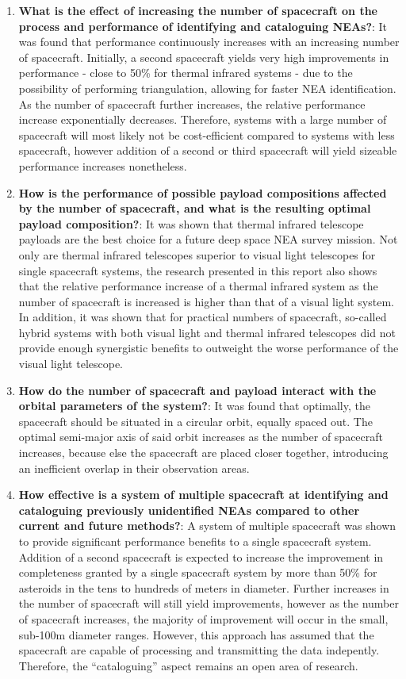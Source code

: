 \begin{enumerate}
 \item \textbf{What is the effect of increasing the number of spacecraft on the process and performance of identifying and cataloguing NEAs?}: It was found that performance continuously increases with an increasing number of spacecraft. Initially, a second spacecraft yields very high improvements in performance - close to 50\% for thermal infrared systems - due to the possibility of performing triangulation, allowing for faster NEA identification. As the number of spacecraft further increases, the relative performance increase exponentially decreases. Therefore, systems with a large number of spacecraft will most likely not be cost-efficient compared to systems with less spacecraft, however addition of a second or third spacecraft will yield sizeable performance increases nonetheless.
 \item \textbf{How is the performance of possible payload compositions affected by the number of spacecraft, and what is the resulting optimal payload composition?}: It was shown that thermal infrared telescope payloads are the best choice for a future deep space NEA survey mission. Not only are thermal infrared telescopes superior to visual light telescopes for single spacecraft systems, the research presented in this report also shows that the relative performance increase of a thermal infrared system as the number of spacecraft is increased is higher than that of a visual light system. In addition, it was shown that for practical numbers of spacecraft, so-called hybrid systems with both visual light and thermal infrared telescopes did not provide enough synergistic benefits to outweight the worse performance of the visual light telescope.
 \item \textbf{How do the number of spacecraft and payload interact with the orbital parameters of the system?}: It was found that optimally, the spacecraft should be situated in a circular orbit, equally spaced out. The optimal semi-major axis of said orbit increases as the number of spacecraft increases, because else the spacecraft are placed closer together, introducing an inefficient overlap in their observation areas.
 \item \textbf{How effective is a system of multiple spacecraft at identifying and cataloguing previously unidentified NEAs compared to other current and future methods?}: A system of multiple spacecraft was shown to provide significant performance benefits to a single spacecraft system. Addition of a second spacecraft is expected to increase the improvement in completeness granted by a single spacecraft system by more than 50\% for asteroids in the tens to hundreds of meters in diameter. Further increases in the number of spacecraft will still yield improvements, however as the number of spacecraft increases, the majority of improvement will occur in the small, sub-100m diameter ranges. However, this approach has assumed that the spacecraft are capable of processing and transmitting the data indepently. Therefore, the ``cataloguing'' aspect remains an open area of research.
\end{enumerate}

